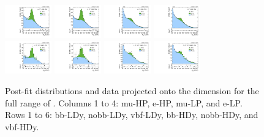 \begin{figure}[htbp]
  \includegraphics[width=0.18\textwidth]{fig/fitValidation/PostFit_SR_MJJ__mu_HP_nobb_HDy_Run2.pdf}
  \includegraphics[width=0.18\textwidth]{fig/fitValidation/PostFit_SR_MJJ__e_HP_nobb_HDy_Run2.pdf}
  \includegraphics[width=0.18\textwidth]{fig/fitValidation/PostFit_SR_MJJ__mu_LP_nobb_HDy_Run2.pdf}
  \includegraphics[width=0.18\textwidth]{fig/fitValidation/PostFit_SR_MJJ__e_LP_nobb_HDy_Run2.pdf}\\
  \includegraphics[width=0.18\textwidth]{fig/fitValidation/PostFit_SR_MJJ__mu_HP_vbf_HDy_Run2.pdf}
  \includegraphics[width=0.18\textwidth]{fig/fitValidation/PostFit_SR_MJJ__e_HP_vbf_HDy_Run2.pdf}
  \includegraphics[width=0.18\textwidth]{fig/fitValidation/PostFit_SR_MJJ__mu_LP_vbf_HDy_Run2.pdf}
  \includegraphics[width=0.18\textwidth]{fig/fitValidation/PostFit_SR_MJJ__e_LP_vbf_HDy_Run2.pdf}\\
  \caption{
    Post-fit distributions and data projected onto the \MJ dimension for the full range of \MVV.
    Columns 1 to 4: mu-HP, e-HP, mu-LP, and e-LP.
    Rows 1 to 6: bb-LDy, nobb-LDy, vbf-LDy, bb-HDy, nobb-HDy, and vbf-HDy.
  }
  \label{fig:postfit_MJJ_Run2}
\end{figure}

